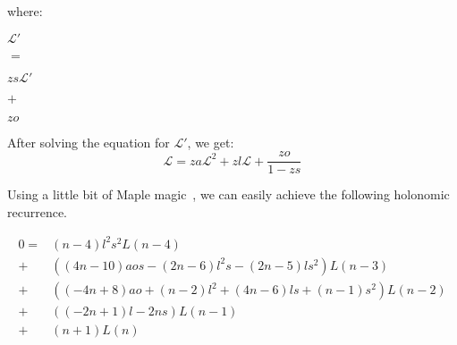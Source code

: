 \documentclass[final]{article}
\theoremstyle{definition}
\theoremstyle{definition}
\theoremstyle{remark}
\newcommand{\gf}[1]{\ensuremath{\mathcal{#1}}}
\begin{document}
where:

\begin{center}
    \begin{minipage}[t]{.2\textwidth}
        \begin{center}
            \(\gf{L'}\)\\
        \end{center}
    \end{minipage}%
    \begin{minipage}[t]{.05\textwidth}
        \begin{center}
            \(=\)\\
        \end{center}
    \end{minipage}%
    \begin{minipage}[t]{.2\textwidth}
        \begin{center}
            \(z s \gf{L'}\)\\
        \end{center}
    \end{minipage}%
    \begin{minipage}[t]{.05\textwidth}
        \begin{center}
            \(+\)\\
        \end{center}
    \end{minipage}%
    \begin{minipage}[t]{.2\textwidth}
        \begin{center}
            \(z o\)\\
        \end{center}
    \end{minipage}%
\end{center}

After solving the equation for \(\gf{L'}\), we get:
\[\gf{L} = z a \gf{L}^2 + z l \gf{L} + \frac{z o}{1 - z s}\]

Using a little bit of Maple magic~\cite{gfun}, we can easily achieve the following holonomic recurrence.

\[\begin{array}{rl}
        0 =& (n - 4) l^2 s^2 L(n - 4)\\
        +& ((4 n - 10) a o s - (2 n - 6) l^2 s - (2 n - 5) l s^2) L(n - 3)\\
        +& ((-4 n + 8) a o + (n - 2) l^2 + (4 n - 6) l s + (n - 1) s^2) L(n - 2)\\
        +& ((-2 n + 1) l - 2 n s) L(n - 1)\\
        +& (n + 1) L(n)
\end{array}\]
\end{document}
